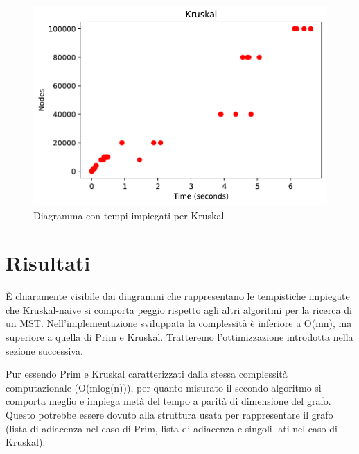 \begin{figure}[htp]
    \centering
    \includegraphics[width=\textwidth]{immagini/kruskal.pdf}
    \caption{Diagramma con tempi impiegati per Kruskal}
    \label{fig:diagramma-kruskal}
\end{figure}

\clearpage

\section{Risultati\label{sec:risultati}}
È chiaramente visibile dai diagrammi che rappresentano le tempistiche impiegate che Kruskal-naive si comporta peggio rispetto agli altri algoritmi per la ricerca di un MST.
Nell'implementazione sviluppata la complessità è inferiore a O(mn), ma superiore a quella di Prim e Kruskal.
Tratteremo l'ottimizzazione introdotta nella sezione successiva.

Pur essendo Prim e Kruskal caratterizzati dalla stessa complessità computazionale (O(mlog(n))), per quanto misurato il secondo algoritmo si comporta meglio e impiega metà del tempo a parità di dimensione del grafo.
Questo potrebbe essere dovuto alla struttura usata per rappresentare il grafo (lista di adiacenza nel caso di Prim, lista di adiacenza e singoli lati nel caso di Kruskal).